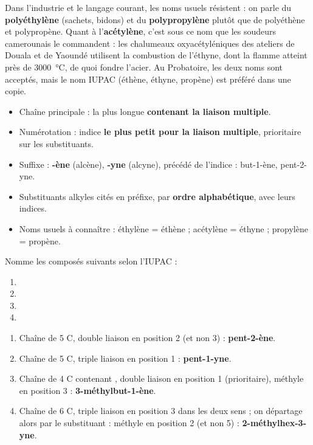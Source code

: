 \documentclass[11pt]{article}
\begin{document}
\begin{savaistu}
Dans l'industrie et le langage courant, les noms usuels résistent : on parle du \textbf{polyéthylène} (sachets, bidons) et du \textbf{polypropylène} plutôt que de polyéthène et polypropène. Quant à l'\textbf{acétylène}, c'est sous ce nom que les soudeurs camerounais le commandent : les chalumeaux oxyacétyléniques des ateliers de Douala et de Yaoundé utilisent la combustion de l'éthyne, dont la flamme atteint près de \SI{3000}{\celsius}, de quoi fondre l'acier. Au Probatoire, les deux noms sont acceptés, mais le nom IUPAC (éthène, éthyne, propène) est préféré dans une copie.
\end{savaistu}

\begin{aretenir}
\begin{itemize}
\item Chaîne principale : la plus longue \textbf{contenant la liaison multiple}.
\item Numérotation : indice \textbf{le plus petit pour la liaison multiple}, prioritaire sur les substituants.
\item Suffixe : \textbf{-ène} (alcène), \textbf{-yne} (alcyne), précédé de l'indice : but-1-ène, pent-2-yne.
\item Substituants alkyles cités en préfixe, par \textbf{ordre alphabétique}, avec leurs indices.
\item Noms usuels à connaître : éthylène = éthène ; acétylène = éthyne ; propylène = propène.
\end{itemize}
\end{aretenir}

\begin{exercice}
Nomme les composés suivants selon l'IUPAC :
\begin{enumerate}
\item {}
\item {}
\item {}
\item {}
\end{enumerate}
\end{exercice}

\begin{corrige}[Exercice n°1]
\begin{enumerate}
\item Chaîne de 5 C, double liaison en position 2 (et non 3) : \textbf{pent-2-ène}.
\item Chaîne de 5 C, triple liaison en position 1 : \textbf{pent-1-yne}.
\item Chaîne de 4 C contenant , double liaison en position 1 (prioritaire), méthyle en position 3 : \textbf{3-méthylbut-1-ène}.
\item Chaîne de 6 C, triple liaison en position 3 dans les deux sens ; on départage alors par le substituant : méthyle en position 2 (et non 5) : \textbf{2-méthylhex-3-yne}.
\end{enumerate}
\end{corrige}
\end{document}
